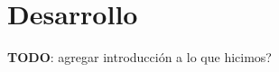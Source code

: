\section{Desarrollo}

{\LARGE \textbf{TODO}: agregar introducción a lo que hicimos?}







 






